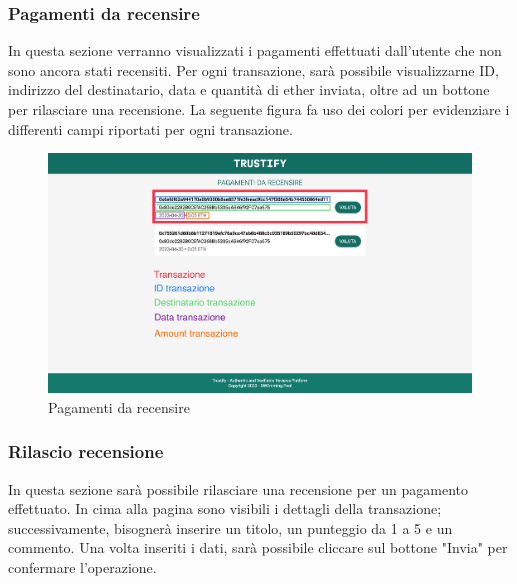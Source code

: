 \subsubsection{Pagamenti da recensire}
In questa sezione verranno visualizzati i pagamenti effettuati dall'utente che non sono ancora stati recensiti. Per ogni transazione, sarà possibile visualizzarne ID, indirizzo del destinatario, data e quantità di ether inviata, oltre ad un bottone per rilasciare una recensione. La seguente figura fa uso dei colori per evidenziare i differenti campi riportati per ogni transazione.
\begin{figure}[H]
    \centering
    \includegraphics[scale=0.18]{src/img/pagamenti.jpg}
    \caption[Pagamenti da recensire]{Pagamenti da recensire\protect\footnotemark}\label{fig:pagamenti}
\end{figure}


\subsubsection{Rilascio recensione}
In questa sezione sarà possibile rilasciare una recensione per un pagamento effettuato. In cima alla pagina sono visibili i dettagli della transazione; successivamente, bisognerà inserire un titolo, un punteggio da 1 a 5 e un commento. Una volta inseriti i dati, sarà possibile cliccare sul bottone "Invia" per confermare l'operazione.

